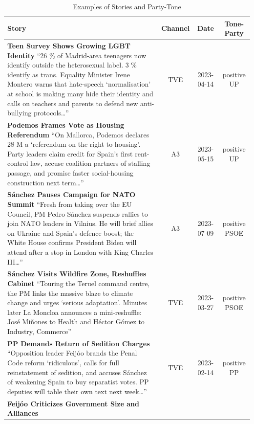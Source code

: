 \documentclass[12pt]{article}
\begin{document}
\begin{longtable}{|p{8cm}|c|c|c|}
\caption{Examples of Stories and Party-Tone} \\
	\hline
	\textbf{Story} & \textbf{Channel} & \textbf{Date} & \textbf{Tone-Party}\\
	\hline
	\textbf{Teen Survey Shows Growing LGBT Identity}\newline
	{\scriptsize
		“26 \% of Madrid-area teenagers now identify outside the heterosexual label. 3 \% identify as trans.  
		Equality Minister Irene Montero warns that hate-speech ‘normalisation’ at school is making many hide their identity and calls on teachers and parents to defend new anti-bullying protocols…”}
	& TVE & 2023-04-14 & positive UP\\
	\hline
	\textbf{Podemos Frames Vote as Housing Referendum}\newline
	{\scriptsize
		“On Mallorca, Podemos declares 28-M a ‘referendum on the right to housing’.  
		Party leaders claim credit for Spain’s first rent-control law, accuse coalition partners of stalling passage, and promise faster social-housing construction next term…”}
	& A3 & 2023-05-15 & positive UP\\
	\hline
	\textbf{Sánchez Pauses Campaign for NATO Summit}\newline
	{\scriptsize
		“Fresh from taking over the EU Council, PM Pedro Sánchez suspends rallies to join NATO leaders in Vilnius.  
		He will brief allies on Ukraine and Spain’s defence boost; the White House confirms President Biden will attend after a stop in London with King Charles III…”}
	& A3 & 2023-07-09 & positive PSOE\\
	\hline
	\textbf{Sánchez Visits Wildfire Zone, Reshuffles Cabinet}\newline
	{\scriptsize
		“Touring the Teruel command centre, the PM links the massive blaze to climate change and urges ‘serious adaptation’.  
		Minutes later La Moncloa announces a mini-reshuffle: José Miñones to Health and Héctor Gómez to Industry, Commerce”}
	& TVE & 2023-03-27 & positive PSOE\\
	\hline
	\textbf{PP Demands Return of Sedition Charges}\newline
	{\scriptsize
		“Opposition leader Feijóo brands the Penal Code reform ‘ridiculous’, calls for full reinstatement of sedition, and accuses Sánchez of weakening Spain to buy separatist votes.  
		PP deputies will table their own text next week…”}
	& TVE & 2023-02-14 & positive PP\\
	\hline
	\textbf{Feijóo Criticizes Government Size and Alliances}\newline

\end{longtable}
\end{document}
